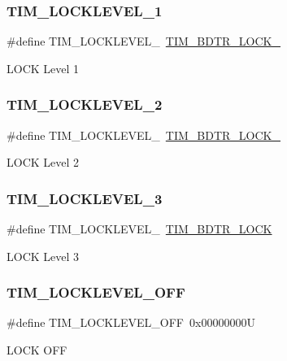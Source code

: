 \subsubsection{\texorpdfstring{TIM\_LOCKLEVEL\_1}{TIM\_LOCKLEVEL\_1}}
{\footnotesize\ttfamily \#define T\+I\+M\+\_\+\+L\+O\+C\+K\+L\+E\+V\+E\+L\+\_~\mbox{\hyperlink{group___peripheral___registers___bits___definition_gabbd1736c8172e7cd098bb591264b07bf}{T\+I\+M\+\_\+\+B\+D\+T\+R\+\_\+\+L\+O\+C\+K\+\_}}}

L\+O\+CK Level 1 \mbox{\label{group___t_i_m___lock__level_ga03a5ed2aded43ccfe7ab12a9dd53d251}} 
\subsubsection{\texorpdfstring{TIM\_LOCKLEVEL\_2}{TIM\_LOCKLEVEL\_2}}
{\footnotesize\ttfamily \#define T\+I\+M\+\_\+\+L\+O\+C\+K\+L\+E\+V\+E\+L\+\_~\mbox{\hyperlink{group___peripheral___registers___bits___definition_ga756df80ff8c34399435f52dca18e6eee}{T\+I\+M\+\_\+\+B\+D\+T\+R\+\_\+\+L\+O\+C\+K\+\_}}}

L\+O\+CK Level 2 \mbox{\label{group___t_i_m___lock__level_gaa1afed375c27151608e388fdf4a57a13}} 
\subsubsection{\texorpdfstring{TIM\_LOCKLEVEL\_3}{TIM\_LOCKLEVEL\_3}}
{\footnotesize\ttfamily \#define T\+I\+M\+\_\+\+L\+O\+C\+K\+L\+E\+V\+E\+L\+\_~\mbox{\hyperlink{group___peripheral___registers___bits___definition_ga7e4215d17f0548dfcf0b15fe4d0f4651}{T\+I\+M\+\_\+\+B\+D\+T\+R\+\_\+\+L\+O\+CK}}}

L\+O\+CK Level 3 \mbox{\label{group___t_i_m___lock__level_ga304aece56a9391a4d9b1016144d98fbd}} 
\subsubsection{\texorpdfstring{TIM\_LOCKLEVEL\_OFF}{TIM\_LOCKLEVEL\_OFF}}
{\footnotesize\ttfamily \#define T\+I\+M\+\_\+\+L\+O\+C\+K\+L\+E\+V\+E\+L\+\_\+\+O\+FF~0x00000000U}

L\+O\+CK O\+FF 